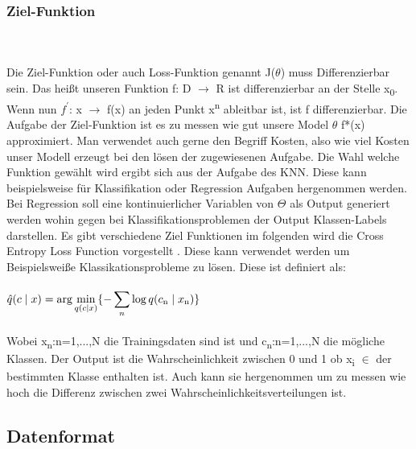 \documentclass{llncs}
\begin{document}
	
	\subsubsection{Ziel-Funktion}\label{sec:Zielfunktion}
	~\\\\
	Die Ziel-Funktion oder auch Loss-Funktion genannt J($\theta$) muss Differenzierbar sein. Das heißt unseren Funktion f: D $\to$ R ist differenzierbar an der Stelle x\textsubscript{0}. Wenn nun $f^\prime$: x $\to$ f(x) an jeden Punkt x\textsuperscript{n} ableitbar ist, ist f differenzierbar. Die Aufgabe der Ziel-Funktion ist es zu messen wie gut unsere Model $\theta$ f*(x) approximiert. Man verwendet auch gerne den Begriff Kosten, also wie viel Kosten unser Modell erzeugt bei den lösen der zugewiesenen Aufgabe. Die Wahl welche Funktion gewählt wird ergibt sich aus der Aufgabe des KNN. Diese kann beispielsweise für Klassifikation oder Regression Aufgaben hergenommen werden. Bei Regression soll eine kontinuierlicher Variablen von $\Theta$ als Output generiert werden wohin gegen bei Klassifikationsproblemen der Output Klassen-Labels darstellen\cite{Grundlagen}. Es gibt verschiedene Ziel Funktionen im folgenden wird die Cross Entropy Loss Function vorgestellt \cite{crossentropy}. Diese kann verwendet werden um Beispielsweiße Klassikationsprobleme zu lösen. Diese ist definiert als:
	\\\\
	\begin{math}
	\hat{q}(c\mid x)=\displaystyle\arg\min_{q(c\mid  x)}\{-\displaystyle\sum_{n}{\log q(c\textsubscript{n}\mid x\textsubscript{n})}\}
	\end{math}
	\\\\
	Wobei  x\textsubscript{n}:n=1,...,N die Trainingsdaten sind ist und c\textsubscript{n}:n=1,...,N die mögliche Klassen. Der Output ist die Wahrscheinlichkeit zwischen 0 und 1 ob  x\textsubscript{i} $\in$ der bestimmten Klasse enthalten ist. Auch kann sie hergenommen um zu messen wie hoch die Differenz zwischen zwei Wahrscheinlichkeitsverteilungen ist.
	
	\subsection{Datenformat}
	
\end{document}
